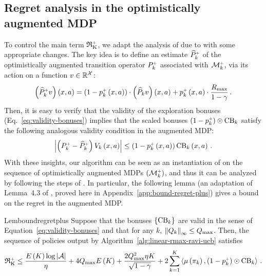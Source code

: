 \subsection{Regret analysis in the optimistically augmented MDP}

To control the main term $\operatorname{\mathfrak{R}_K^\mathsf{\scriptscriptstyle +}}$, we adapt the analysis of \raviUCB due to \citet{MN23} with some appropriate changes. The key idea is to define an estimate $\widehat{P}_k^\mathsf{\scriptscriptstyle +}$ of the optimistically augmented transition operator $P_k^\mathsf{\scriptscriptstyle +}$ associated with $\mathcal{M}^{\mathsf{\scriptscriptstyle +}}_k$, via its action on a function $v\in\mathbb{R}^{\mathcal{X}}$:
\begin{equation*}
    \left(\widehat{P}^{\mathsf{\scriptscriptstyle +}}_k v\right)\left(x,a\right) = \left( 1 - p_k^{\mathsf{\scriptscriptstyle +}} \left( x, a \right) \right) \cdot \left(\widehat{P}_k v\right){\left(x,a\right)} + p_k^{\mathsf{\scriptscriptstyle +}} \left( x, a \right)\cdot \frac{R_{\max}}{1-\gamma}\,.
\end{equation*}
%
Then, it is easy to verify that the validity of the exploration bonuses (Eq.~\ref{eq:validity-bonuses}) implies that the scaled bonuses $\left( 1 - p_k^{\mathsf{\scriptscriptstyle +}} \right) \odot \operatorname{CB}_k$ satisfy the following analogous validity condition in the augmented MDP:
%
\begin{equation*}
    \left|\left( P_k^\mathsf{\scriptscriptstyle +} - \widehat{P}_k^\mathsf{\scriptscriptstyle +} \right) V_k \left( x, a \right)\right| \leq \left( 1 - p_k^{\mathsf{\scriptscriptstyle +}} \left( x, a \right) \right) \operatorname{CB}_k \left( x, a \right)\,.
\end{equation*}
%
With these insights, our algorithm can be seen as an instantiation of \raviUCB on the sequence of optimistically augmented MDPs $\left(\mathcal{M}_k^{\mathsf{\scriptscriptstyle +}}\right)$, and thus it can be analyzed by following the steps of \citet{MN23}. In particular, the following lemma (an adaptation of Lemma~4.3 of \citet{MN23}, proved here in Appendix~\ref{app:bound-regret-plus}) gives a bound on the regret in the augmented MDP.
%
\begin{restatable}{Lem}{boundregretplus} \label{lem:bound-regret-plus}
    Suppose that the bonuses $\left\{ \operatorname{CB}_k \right\}$ are valid in the sense of Equation~\ref{eq:validity-bonuses} and that for any $k$, $\left\|Q_k\right\|_\infty \leq Q_{\max}$. Then, the sequence of policies output by Algorithm~\ref{alg:linear-rmax-ravi-ucb} satisfies
    \begin{equation} %
        \regretKplus \leq \frac{E \spr{K} \log \abs{\cA}}{\eta} + 4 \VMAX E \spr{K} + \frac{2 \QMAX^2 \eta K}{\sqrt{1 - \gamma}} + 2 \sumkK \inp{\mu \spr{\pi_k}, \spr{1 - p_k^\upplus} \odot \CB_k}\,.
    \end{equation}
\end{restatable}


